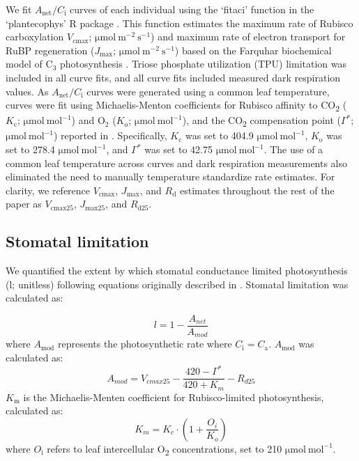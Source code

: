 We fit $A_\mathrm{{net}}/C_\mathrm{i}$ curves of each individual using the ‘fitaci’ function in the ‘plantecophys’ R package . This function estimates the maximum rate of Rubisco carboxylation $V_{\mathrm{cmax}}$; $\mathrm{\mu mol\ m^{-2}\ s^{-1}}$) and maximum rate of electron transport for RuBP regeneration ($J_{\mathrm{max}}$; $\mathrm{\mu mol\ m^{-2}\ s^{-1}}$) based on the Farquhar biochemical model of C$_{3}$ photosynthesis . Triose phosphate utilization (TPU) limitation was included in all curve fits, and all curve fits included measured dark respiration values. As $A_\mathrm{{net}}/C_\mathrm{i}$ curves were generated using a common leaf temperature, curves were fit using Michaelis-Menton coefficients for Rubisco affinity to CO\textsubscript{2} ($K_\mathrm{c}$; $\mathrm{\mu mol\ mol^{-1}}$) and $\mathrm{O_2}$ ($K_\mathrm{o}$; $\mathrm{\mu mol\ mol^{-1}}$), and the CO\textsubscript{2} compensation point ($\Gamma^*$; $\mathrm{\mu mol\ mol^{-1}}$) reported in . Specifically, $K_\mathrm{c}$ was set to 404.9 $\mathrm{\mu mol\ mol^{-1}}$, $K_\mathrm{o}$ was set to 278.4 $\mathrm{\mu mol\ mol^{-1}}$, and $\Gamma^*$ was set to 42.75 $\mathrm{\mu mol\ mol^{-1}}$. The use of a common leaf temperature across curves and dark respiration measurements also eliminated the need to manually temperature standardize rate estimates. For clarity, we reference $V_{\mathrm{cmax}}$, $J_{\mathrm{max}}$, and $R_{\mathrm{d}}$ estimates throughout the rest of the paper as $V_{\mathrm{cmax25}}$, $J_{\mathrm{max25}}$, and $R_{\mathrm{d25}}$.

\subsection{Stomatal limitation}

We quantified the extent by which stomatal conductance limited photosynthesis (l; unitless) following equations originally described in . Stomatal limitation was calculated as:

\begin{equation} \label{eq_5.3}
    l = 1 - \frac{A_{net}}{A_{mod}}
\end{equation}
\noindent where $A_\mathrm{mod}$ represents the photosynthetic rate where $C_\mathrm{{i}}=C_\mathrm{{a}}$. $A_\mathrm{mod}$ was calculated as:
\begin{equation} \label{eq_5.4}
    A_{mod} = V_{cmax25} - \frac{420 - \Gamma^*}{420 + K_{m}} - R_{d25}
\end{equation}
\noindent $K_\mathrm{m}$ is the Michaelis-Menten coefficient for Rubisco-limited photosynthesis, calculated as:
\begin{equation} \label{eq_5.5}
    K_{m} = K_{c} \cdot \left ( 1 + \frac{O_i}{K_o} \right )
\end{equation}
\noindent where $O_\mathrm{i}$ refers to leaf intercellular O\textsubscript{2} concentrations, set to 210 $\mathrm{\mu mol\ mol^{-1}}$.

